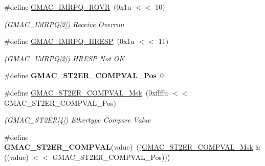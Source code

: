 \begin{DoxyCompactItemize}
\mbox{\label{group__SAME70__GMAC_gadc8277962b306b723ef390a824a05c12}} 
\#define \mbox{\hyperlink{group__SAME70__GMAC_gadc8277962b306b723ef390a824a05c12}{G\+M\+A\+C\+\_\+\+I\+M\+R\+P\+Q\+\_\+\+R\+O\+VR}}~(0x1u $<$$<$ 10)
\begin{DoxyCompactList}\small\item\em (G\+M\+A\+C\+\_\+\+I\+M\+R\+PQ\mbox{[}2\mbox{]}) Receive Overrun \end{DoxyCompactList}\item 
\mbox{\label{group__SAME70__GMAC_ga78c858ae4cc7578674ca1ac86b9b9a16}} 
\#define \mbox{\hyperlink{group__SAME70__GMAC_ga78c858ae4cc7578674ca1ac86b9b9a16}{G\+M\+A\+C\+\_\+\+I\+M\+R\+P\+Q\+\_\+\+H\+R\+E\+SP}}~(0x1u $<$$<$ 11)
\begin{DoxyCompactList}\small\item\em (G\+M\+A\+C\+\_\+\+I\+M\+R\+PQ\mbox{[}2\mbox{]}) H\+R\+E\+SP Not OK \end{DoxyCompactList}\item 
\mbox{\label{group__SAME70__GMAC_gacf2d9754029ec355acc06b76712665b5}} 
\#define {\bfseries G\+M\+A\+C\+\_\+\+S\+T2\+E\+R\+\_\+\+C\+O\+M\+P\+V\+A\+L\+\_\+\+Pos}~0
\item 
\mbox{\label{group__SAME70__GMAC_gabbb9dd848f8465fdaeefca5e6d6e2db4}} 
\#define \mbox{\hyperlink{group__SAME70__GMAC_gabbb9dd848f8465fdaeefca5e6d6e2db4}{G\+M\+A\+C\+\_\+\+S\+T2\+E\+R\+\_\+\+C\+O\+M\+P\+V\+A\+L\+\_\+\+Msk}}~(0xffffu $<$$<$ G\+M\+A\+C\+\_\+\+S\+T2\+E\+R\+\_\+\+C\+O\+M\+P\+V\+A\+L\+\_\+\+Pos)
\begin{DoxyCompactList}\small\item\em (G\+M\+A\+C\+\_\+\+S\+T2\+ER\mbox{[}4\mbox{]}) Ethertype Compare Value \end{DoxyCompactList}\item 
\mbox{\label{group__SAME70__GMAC_gad3fc996e5079029f4969fae449674df5}} 
\#define {\bfseries G\+M\+A\+C\+\_\+\+S\+T2\+E\+R\+\_\+\+C\+O\+M\+P\+V\+AL}(value)~((\mbox{\hyperlink{group__SAMV71__GMAC_gabbb9dd848f8465fdaeefca5e6d6e2db4}{G\+M\+A\+C\+\_\+\+S\+T2\+E\+R\+\_\+\+C\+O\+M\+P\+V\+A\+L\+\_\+\+Msk}} \& ((value) $<$$<$ G\+M\+A\+C\+\_\+\+S\+T2\+E\+R\+\_\+\+C\+O\+M\+P\+V\+A\+L\+\_\+\+Pos)))
\item 

\end{DoxyCompactItemize}
